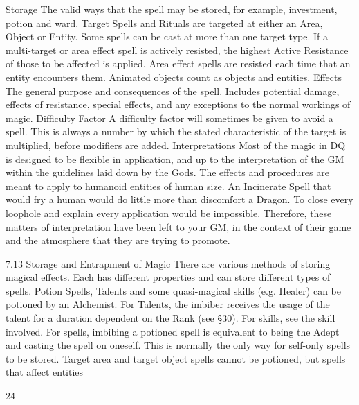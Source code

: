 \documentclass[a4paper]{article}
\begin{document}
\begin{multicols}{3}
Storage The valid ways that the spell may be
stored, for example, investment, potion and ward.
Target Spells and Rituals are targeted at either an
Area, Object or Entity. Some spells can be cast at
more than one target type. If a multi-target or area
effect spell is actively resisted, the highest Active
Resistance of those to be affected is applied. Area
effect spells are resisted each time that an entity
encounters them. Animated objects count as objects and entities.
Effects The general purpose and consequences of
the spell. Includes potential damage, effects of
resistance, special effects, and any exceptions to
the normal workings of magic.
Difficulty Factor A difficulty factor will sometimes be given to avoid a spell. This is always a
number by which the stated characteristic of the
target is multiplied, before modifiers are added.
Interpretations
Most of the magic in DQ is designed to be flexible
in application, and up to the interpretation of the
GM within the guidelines laid down by the Gods.
The effects and procedures are meant to apply to
humanoid entities of human size. An Incinerate
Spell that would fry a human would do little more
than discomfort a Dragon. To close every loophole
and explain every application would be impossible.
Therefore, these matters of interpretation have
been left to your GM, in the context of their game
and the atmosphere that they are trying to promote.

7.13 Storage and Entrapment of Magic
There are various methods of storing magical effects. Each has different properties and can store
different types of spells.
Potion Spells, Talents and some quasi-magical
skills (e.g. Healer) can be potioned by an Alchemist. For Talents, the imbiber receives the usage of
the talent for a duration dependent on the Rank
(see §30). For skills, see the skill involved. For
spells, imbibing a potioned spell is equivalent to
being the Adept and casting the spell on oneself.
This is normally the only way for self-only spells
to be stored. Target area and target object spells
cannot be potioned, but spells that affect entities

24


\end{multicols}
\end{document}
